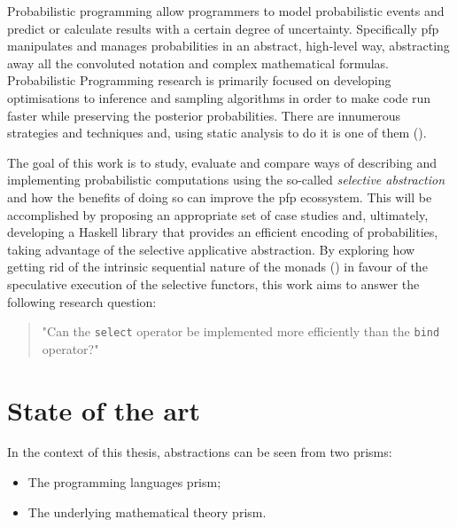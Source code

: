 \documentclass[
  oneside,
  11pt, a4paper,
  footinclude=true,
  headinclude=true,
  cleardoublepage=empty
]{scrbook}
\theoremstyle{definition}
\theoremstyle{definition}
\begin{document}
	    Probabilistic programming allow programmers to model probabilistic events and predict or calculate results with a certain degree of uncertainty. Specifically \gls{pfp} manipulates and manages probabilities in an abstract, high-level way, abstracting away all the convoluted notation and complex mathematical formulas. Probabilistic Programming research is primarily focused on developing optimisations to inference and sampling algorithms in order to make code run faster while preserving the posterior probabilities. There are innumerous strategies and techniques and, using static analysis to do it is one of them (\cite{bernstein2019static}).
    
        The goal of this work is to study, evaluate and compare ways of describing and implementing probabilistic computations using the so-called \emph{selective abstraction} and how the benefits of doing so can improve the \gls{pfp} ecossystem. This will be accomplished by proposing an appropriate set of case studies and, ultimately, developing a Haskell library that provides an efficient encoding of probabilities, taking advantage of the selective applicative abstraction. By exploring how getting rid of the intrinsic sequential nature of the monads (\cite{Scibior:2015:PPP:2887747.2804317}) in favour of the speculative execution of the selective functors, this work aims to answer the following research question:
        \begin{quote}
        "Can the \texttt{select} operator be implemented more efficiently than the \texttt{bind} operator?"
        \end{quote}

		
	\section{State of the art}\label{sec-state-art}
	    In the context of this thesis, abstractions can be seen from two prisms:
	    \begin{itemize}
	        \item The programming languages prism;
	        \item The underlying mathematical theory prism.
	    \end{itemize}{}
	    
\end{document}
